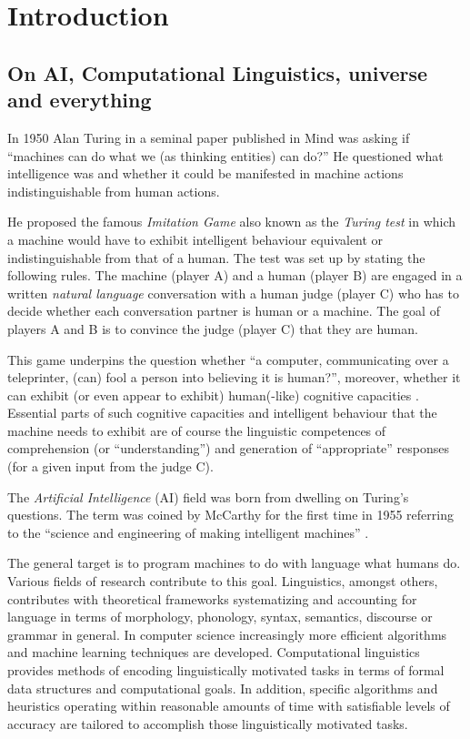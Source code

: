 \chapter{Introduction}

\section{On AI, Computational Linguistics, universe and everything}
In 1950 Alan Turing in a seminal paper \citep{Turing1950} published in Mind was asking if ``machines can do what we (as thinking entities) can do?'' He questioned what intelligence was and whether it could be manifested in machine actions indistinguishable from human actions. 

He proposed the famous \textit{Imitation Game} also known as the \textit{Turing test} in which a machine would have to exhibit intelligent behaviour equivalent or indistinguishable from that of a human. The test was set up by stating the following rules. The machine (player A) and a human (player B) are engaged in a written \textit{natural language} conversation with a human judge (player C) who has to decide whether each conversation partner is human or a machine. The goal of players A and B is to convince the judge (player C) that they are human. 

This game underpins the question whether ``a computer, communicating over a teleprinter, (can) fool a person into believing it is human?'', moreover, whether it can exhibit (or even appear to exhibit) human(-like) cognitive capacities \citep{Harnad1992}. Essential parts of such cognitive capacities and intelligent behaviour that the machine needs to exhibit are of course the linguistic competences of comprehension (or ``understanding'') and generation of ``appropriate'' responses (for a given input from the judge C).

The \textit{Artificial Intelligence} (AI) field was born from dwelling on Turing's questions. The term was coined by McCarthy for the first time in 1955 referring to the ``science and engineering of making intelligent machines'' \citep{McCarthy1955}.

The general target is to program machines to do with language what humans do. Various fields of research contribute to this goal. Linguistics, amongst others, contributes with theoretical frameworks systematizing and accounting for language in terms of morphology, phonology, syntax, semantics, discourse or grammar in general. In computer science increasingly more efficient algorithms and machine learning techniques are developed. Computational linguistics provides methods of encoding linguistically motivated tasks in terms of formal data structures and computational goals. In addition, specific algorithms and heuristics operating within reasonable amounts of time with satisfiable levels of accuracy are tailored to accomplish those linguistically motivated tasks.

